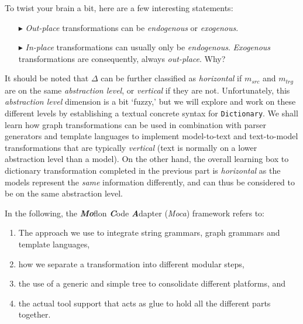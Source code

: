 \newpage
 
To twist your brain a bit, here are a few interesting statements:
\begin{enumerate}

\item[$\blacktriangleright$] \emph{Out-place} transformations can be \emph{endogenous} or \emph{exogenous}.

\item[$\blacktriangleright$] \emph{In-place} transformations can usually only be \emph{endogenous}. \emph{Exo\-gen\-ous} transformations are consequently,
always \emph{out-place}.  Why?

\end{enumerate}  

It should be noted that $\Delta$ can be further classified as \emph{horizontal} if $m_{src}$ and $m_{trg}$ are on the same \emph{abstraction level}, or
\emph{vertical} if they are not. Unfortunately, this \emph{abstraction level} dimension is a bit `fuzzy,' but we will explore and work on these different levels
by establishing a textual concrete syntax for \texttt{Dictionary}. We shall learn how graph transformations can be used in combination with parser generators
and template languages to implement model-to-text and text-to-model transformations that are typically \emph{vertical} (text is normally on a lower abstraction
level than a model). On the other hand, the overall learning box to dictionary transformation completed in the previous part is \emph{horizontal} as the models
represent the \emph{same} information differently, and can thus be considered to be on the same abstraction level.

In the following, the \emph{\bf Mo}flon \emph{\bf C}ode \emph{\bf A}dapter (\emph{Moca}) framework refers to:
\begin{enumerate}

 \item The approach we use to integrate string grammars, graph grammars and template languages, 

 \item how we separate a transformation into different modular steps, 

 \item the use of a generic and simple tree to consolidate different platforms, and 

 \item the actual tool support that acts as glue to hold all the different parts together.

\end{enumerate}

